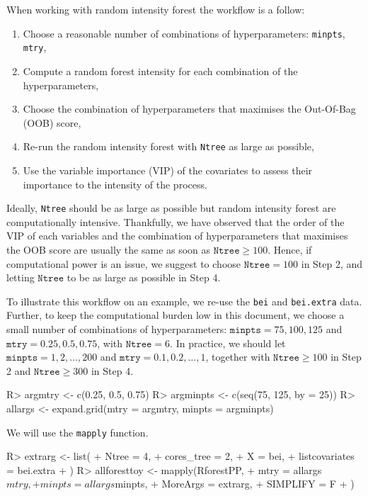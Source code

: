 \documentclass[11pt]{article}
\begin{document}
When working with random intensity forest the workflow is a follow: 
\begin{enumerate}
  \item Choose a reasonable number of combinations of hyperparameters: 
  \texttt{minpts},  \texttt{mtry},
  \item Compute a random forest intensity for each combination 
  of the hyperparameters,
  \item Choose the combination of hyperparameters that maximises 
  the Out-Of-Bag (OOB) score,
  \item Re-run the random intensity forest with
  \texttt{Ntree} as large as possible,
  \item Use the variable importance (VIP) of the covariates 
  to assess their importance to the intensity of the process.
\end{enumerate}

Ideally, \texttt{Ntree} should be as large as possible 
but random intensity forest are computationally intensive. 
Thankfully, we have observed that 
the order of the VIP of each variables and the combination 
of hyperparameters that maximises the OOB score are usually the same 
as soon as $\texttt{Ntree} \geq 100$.   
Hence, if computational power is an issue, we suggest to choose 
$\texttt{Ntree} = 100$ in Step 2, and letting $\texttt{Ntree}$ 
to be as large as possible in Step 4. 

To illustrate this workflow on an example, 
we re-use the \texttt{bei} and \texttt{bei.extra} data. 
Further, to keep the computational burden low in this document, 
we choose a small number of combinations of hyperparameters: 
$\texttt{minpts} = 75, 100, 125$ 
and $\texttt{mtry}= 0.25, 0.5, 0.75$, with $\texttt{Ntree} = 6$. 
In practice, we should let $\texttt{minpts} = 1,2,\ldots,200$ 
and $\texttt{mtry}= 0.1,0.2,\ldots,1$, together with $\texttt{Ntree}\geq 100$ 
in Step 2 and $\texttt{Ntree}\geq 300$ in Step 4.

\begin{Schunk}
\begin{Sinput}
R> argmtry <- c(0.25, 0.5, 0.75)
R> argminpts <- c(seq(75, 125, by = 25))
R> allargs <- expand.grid(mtry = argmtry, minpts = argminpts)
\end{Sinput}
\end{Schunk}

We will use the \texttt{mapply} function. 



\begin{Schunk}
\begin{Sinput}
R> extrarg <- list(
+    Ntree = 4,
+    cores_tree = 2,
+    X = bei,
+    listcovariates = bei.extra
+  )
R> allforesttoy <- mapply(RforestPP,
+    mtry = allargs$mtry,
+    minpts = allargs$minpts,
+    MoreArgs = extrarg,
+    SIMPLIFY = F
+  )
\end{Sinput}
\end{Schunk}
\end{document}
